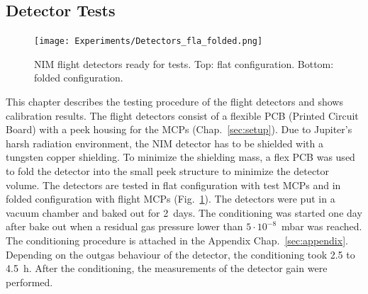 	\subsection{Detector Tests }\label{chapExp:Det}
		
	\begin{figure}[h] %
		\centering
		\texttt{[image: Experiments/Detectors\_fla\_folded.png]}
		\caption{NIM flight detectors ready for tests. Top: flat configuration. Bottom: folded configuration.}
		\label{fig:DetFlatFolded}
	\end{figure}


	This chapter describes the testing procedure of the flight detectors and shows calibration results. The flight detectors consist of a flexible PCB (Printed Circuit Board) with a peek housing for the MCPs (Chap.~\ref{sec:setup}). Due to Jupiter's harsh radiation environment, the NIM detector has to be shielded with a tungsten copper shielding. To minimize the shielding mass, a flex PCB was used to fold the detector into the small peek structure to minimize the detector volume. The detectors are tested in flat configuration with test MCPs and in folded configuration with flight MCPs (Fig.~\ref{fig:DetFlatFolded}). The detectors were put in a vacuum chamber and baked out for 2~days. The conditioning was started one day after bake out when a residual gas pressure lower than $5\cdot10^{-8}$~mbar was reached. The conditioning procedure is attached in the Appendix Chap.~\ref{sec:appendix}. Depending on the outgas behaviour of the detector, the conditioning took 2.5 to 4.5~h. After the conditioning, the measurements of the detector gain were performed.\\
